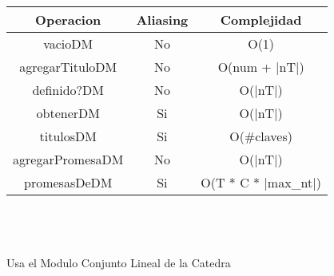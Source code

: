 \begin{tabular}[c]{|c|c|c|}
		\hline
		Operacion & Aliasing & Complejidad \\
		\hline
		vacioDM & No &  O(1)\\
		\hline
		agregarTituloDM & No &  O(num + |nT|)\\
		\hline
		definido?DM & No &  O(|nT|)\\
		\hline
		obtenerDM & Si &  O(|nT|)\\
		\hline
		titulosDM & Si &  O(\#claves)\\
		\hline
		agregarPromesaDM & No &  O(|nT|)\\
		\hline
		promesasDeDM & Si &  O(T * C * |max\_nt|)\\
		\hline
\end{tabular}\\\\
\\
Usa el Modulo {\LARGE Conjunto Lineal} de la Catedra \\
\\

\